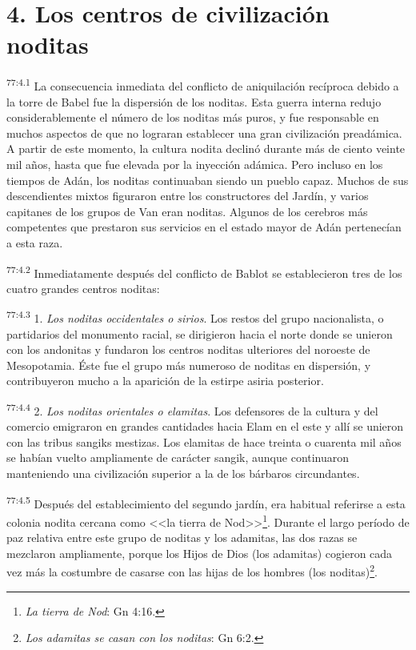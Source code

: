 \section*{4. Los centros de civilización noditas}
\par
\textsuperscript{77:4.1} La consecuencia inmediata del conflicto de aniquilación recíproca debido a la torre de Babel fue la dispersión de los noditas. Esta guerra interna redujo considerablemente el número de los noditas más puros, y fue responsable en muchos aspectos de que no lograran establecer una gran civilización preadámica. A partir de este momento, la cultura nodita declinó durante más de ciento veinte mil años, hasta que fue elevada por la inyección adámica. Pero incluso en los tiempos de Adán, los noditas continuaban siendo un pueblo capaz. Muchos de sus descendientes mixtos figuraron entre los constructores del Jardín, y varios capitanes de los grupos de Van eran noditas. Algunos de los cerebros más competentes que prestaron sus servicios en el estado mayor de Adán pertenecían a esta raza.

\par
\textsuperscript{77:4.2} Inmediatamente después del conflicto de Bablot se establecieron tres de los cuatro grandes centros noditas:

\par
\textsuperscript{77:4.3} 1. \textit{Los noditas occidentales o sirios}. Los restos del grupo nacionalista, o partidarios del monumento racial, se dirigieron hacia el norte donde se unieron con los andonitas y fundaron los centros noditas ulteriores del noroeste de Mesopotamia. Éste fue el grupo más numeroso de noditas en dispersión, y contribuyeron mucho a la aparición de la estirpe asiria posterior.

\par
\textsuperscript{77:4.4} 2. \textit{Los noditas orientales o elamitas}. Los defensores de la cultura y del comercio emigraron en grandes cantidades hacia Elam en el este y allí se unieron con las tribus sangiks mestizas. Los elamitas de hace treinta o cuarenta mil años se habían vuelto ampliamente de carácter sangik, aunque continuaron manteniendo una civilización superior a la de los bárbaros circundantes.

\par
\textsuperscript{77:4.5} Después del establecimiento del segundo jardín, era habitual referirse a esta colonia nodita cercana como <<la tierra de Nod>>\footnote{\textit{La tierra de Nod}: Gn 4:16.}. Durante el largo período de paz relativa entre este grupo de noditas y los adamitas, las dos razas se mezclaron ampliamente, porque los Hijos de Dios (los adamitas) cogieron cada vez más la costumbre de casarse con las hijas de los hombres (los noditas)\footnote{\textit{Los adamitas se casan con los noditas}: Gn 6:2.}.

